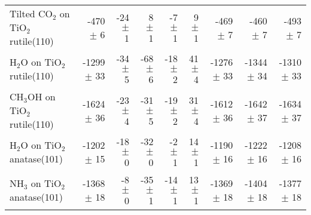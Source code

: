 \begin{table}
\begin{adjustbox}{center,max width=0.9\textwidth}
\begin{tabular}{lrrrrrrrr}
Tilted CO$_2$ on TiO$_2$ rutile(110) & -470 $\pm$ 6 & -24 $\pm$ 1 & 8 $\pm$ 1 & -7 $\pm$ 1 & 9 $\pm$ 1 & -469 $\pm$ 7 & -460 $\pm$ 7 & -493 $\pm$ 7 \\
H$_2$O on TiO$_2$ rutile(110) & -1299 $\pm$ 33 & -34 $\pm$ 5 & -68 $\pm$ 6 & -18 $\pm$ 2 & 41 $\pm$ 4 & -1276 $\pm$ 33 & -1344 $\pm$ 34 & -1310 $\pm$ 33 \\
CH$_3$OH on TiO$_2$ rutile(110) & -1624 $\pm$ 36 & -23 $\pm$ 4 & -31 $\pm$ 5 & -19 $\pm$ 2 & 31 $\pm$ 4 & -1612 $\pm$ 36 & -1642 $\pm$ 37 & -1634 $\pm$ 37 \\
H$_2$O on TiO$_2$ anatase(101) & -1202 $\pm$ 15 & -18 $\pm$ 0 & -32 $\pm$ 0 & -2 $\pm$ 1 & 14 $\pm$ 1 & -1190 $\pm$ 16 & -1222 $\pm$ 16 & -1208 $\pm$ 16 \\
NH$_3$ on TiO$_2$ anatase(101) & -1368 $\pm$ 18 & -8 $\pm$ 0 & -35 $\pm$ 1 & -14 $\pm$ 1 & 13 $\pm$ 1 & -1369 $\pm$ 18 & -1404 $\pm$ 18 & -1377 $\pm$ 18 \\
\bottomrule
\end{tabular}
\end{adjustbox}
\end{table}